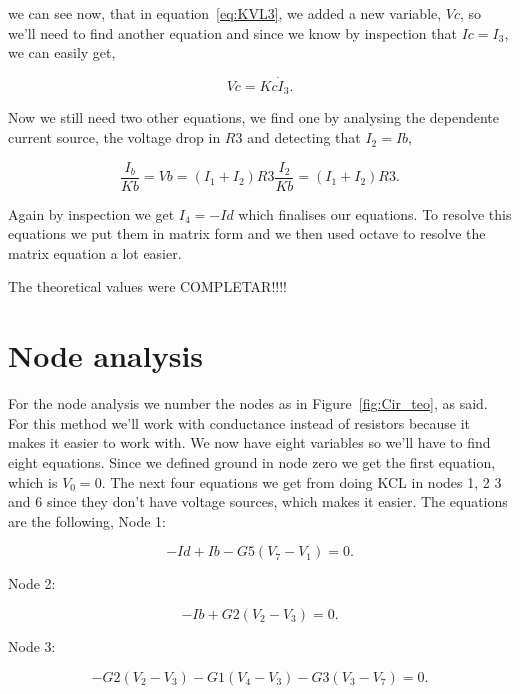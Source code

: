 we can see now, that in equation~\ref{eq:KVL3}, we added a new variable, $Vc$, so we'll need to find another equation and since we know by inspection that $Ic=I_3$, we can easily get,

\begin{equation}
  Vc = Kc \dot I_3.
  \label{eq:Vc}
\end{equation}

Now we still need two other equations, we find one by analysing the dependente current source, the voltage drop in $R3$ and detecting that $I_2=Ib$,

 \begin{equation}
  \frac{I_b}{Kb} = Vb = (I_1 + I_2)R3  \frac{I_2}{Kb} = (I_1 + I_2)R3.
  \label{eq:Vb}
\end{equation}

Again by inspection we get $I_4 = -Id$ which finalises our equations.
To resolve this equations we put them in matrix form and we then used octave to resolve the matrix equation a lot easier.

The theoretical values were COMPLETAR!!!!

\section{Node analysis}

For the node analysis we number the nodes as in Figure~\ref{fig:Cir_teo}, as said. For this method we'll work with conductance instead of resistors because it makes it easier to work with. We now have eight variables so we'll have to find eight equations. Since we defined ground in node zero we get the first equation, which is $V_0=0$. The next four equations we get from doing KCL in nodes 1, 2 3 and 6 since they don't have voltage sources, which makes it easier. The equations are the following,
Node 1:

 \begin{equation}
  -Id + Ib - G5(V_7-V_1) = 0.
  \label{eq:N1}
\end{equation}

Node 2:

 \begin{equation}
  -Ib + G2(V_2-V_3) = 0.
  \label{eq:N2}
\end{equation}

Node 3:

 \begin{equation}
  -G2(V_2-V_3)-G1(V_4-V_3)-G3(V_3-V_7) = 0.
  \label{eq:N3}
\end{equation}

